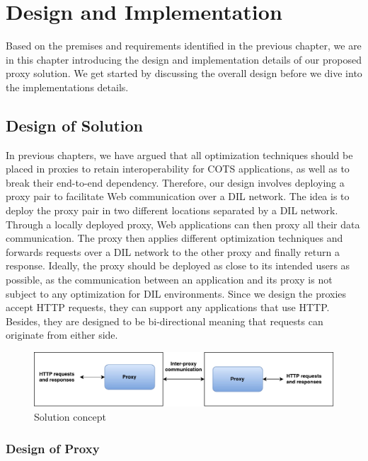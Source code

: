 \chapter{Design and Implementation}
\label{chapter:design}

Based on the premises and requirements identified in the previous chapter, we
are in this chapter introducing the design and implementation details of our
proposed proxy solution. We get started by discussing the overall design before
we dive into the implementations details.

\section{Design of Solution}

In previous chapters, we have argued that all optimization techniques should be
placed in proxies to retain interoperability for COTS applications, as well as
to break their end-to-end dependency. Therefore, our design involves deploying a
proxy pair to facilitate Web communication over a DIL network. The idea is to
deploy the proxy pair in two different locations separated by a DIL network.
Through a locally deployed proxy, Web applications can then proxy all their data
communication. The proxy then applies different optimization techniques and
forwards requests over a DIL network to the other proxy and finally return a
response. Ideally, the proxy should be deployed as close to its intended users
as possible, as the communication between an application and its proxy is not
subject to any optimization for DIL environments. Since we design the proxies
accept HTTP requests, they can support any applications that use HTTP. Besides,
they are designed to be bi-directional meaning that requests can originate from
either side.

\begin{figure}[h]
\includegraphics[width=\textwidth]{images/proxy_design.pdf}
\caption{Solution concept}
\label{figure:proxy_design}
\end{figure}


\subsection{Design of Proxy}

